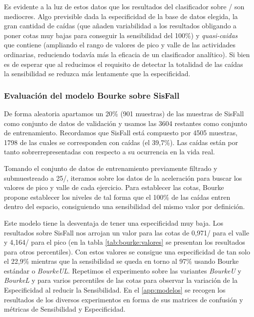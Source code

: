 Es evidente a la luz de estos datos que los resultados del clasificador sobre \sisfall/ son mediocres. Algo previsible dada la especificidad de la base de datos elegida, la gran cantidad de caídas (que añaden variabilidad a los resultados obligando a poner cotas muy bajas para conseguir la sensibilidad del 100\%) y \textit{quasi-caidas} que contiene (ampliando el rango de valores de pico y valle de las actividades ordinarias, reduciendo todavía más la eficacia de un clasificador analítico). Si bien es de esperar que al reducimos el requisito de detectar la totalidad de las caídas la sensibilidad se reduzca más lentamente que la especificidad.

\subsubsection{Evaluación del modelo Bourke sobre SisFall}

De forma aleatoria apartamos un 20\% (901 muestras) de las muestras de SisFall como conjunto de datos de validación y usamos las 3604 restantes como conjunto de entrenamiento. Recordamos que SisFall está compuesto por 4505 muestras, 1798 de las cuales se corresponden con caídas (el 39,7\%). Las caídas están por tanto sobrerrepresentadas con respecto a su ocurrencia en la vida real.

Tomando el conjunto de datos de entrenamiento previamente filtrado y submuestreado a 25\hz/, iteramos sobre los datos de la aceleración para buscar los valores de pico y valle de cada ejercicio. Para establecer las cotas, Bourke propone establecer los niveles de tal forma que el 100\% de las caídas entren dentro del espacio, consiguiendo una sensibilidad del mismo valor por definición. 


  Este modelo tiene la desventaja de tener una especificidad muy baja. Los resultados sobre SisFall nos arrojan un valor para las cotas de 0,971\g/ para el valle y 4,164\g/ para el pico (en la tabla \ref{tab:bourke:valores} se presentan los resultados para otros percentiles). Con estos valores se consigue una especificidad de tan solo el 22,9\% mientras que la sensibilidad se queda en torno al 97\% usando Bourke estándar o \textit{BourkeUL}. Repetimos el experimento sobre las variantes \textit{BourkeU} y \textit{BourkeL} y para varios percentiles de las cotas para observar la variación de la Especificidad al reducir la Sensibilidad. En el \autoref{app:modelos} se recogen los resultados de los diversos experimentos en forma de sus matrices de confusión y métricas de Sensibilidad y Especificidad.  


